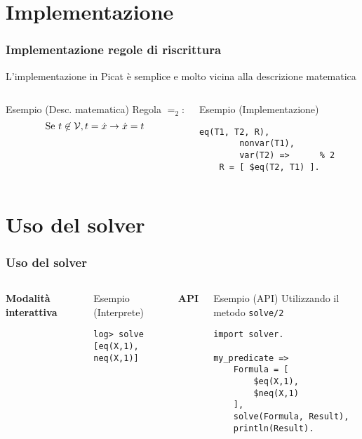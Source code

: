 \documentclass{beamer}
\begin{document}
\section{Implementazione}


\begin{frame}[fragile]
  \frametitle{Implementazione regole di riscrittura} L'implementazione
  in Picat è semplice e molto vicina alla descrizione matematica
  \begin{columns}[c]
    \begin{exampleblock}{Esempio (Desc. matematica)}
      Regola $=_2$:
      \[
      \text{Se }t \not\in \mathcal{V}, t = \dot{x} \to \dot{x} = t
      \]
    \end{exampleblock}
    
    \begin{exampleblock}{Esempio (Implementazione)}
\begin{verbatim}
eq(T1, T2, R), 
        nonvar(T1),
        var(T2) =>      % 2
    R = [ $eq(T2, T1) ].
\end{verbatim}
    \end{exampleblock}
  \end{columns}
\end{frame}

\section{Uso del solver}

\begin{frame}[fragile]
  \frametitle{Uso del solver}
  \begin{columns}[c]
    \textbf{Modalità interattiva}
    \begin{exampleblock}{Esempio (Interprete)}
\begin{verbatim}
log> solve 
[eq(X,1), neq(X,1)]
\end{verbatim}
    \end{exampleblock}

    \textbf{API}
    \begin{exampleblock}{Esempio (API)}
      Utilizzando il metodo \texttt{solve/2}
\begin{verbatim}
import solver.

my_predicate =>
    Formula = [ 
        $eq(X,1), 
        $neq(X,1) 
    ],
    solve(Formula, Result),
    println(Result).
\end{verbatim}
    \end{exampleblock}
  \end{columns}
\end{frame}
\end{document}
